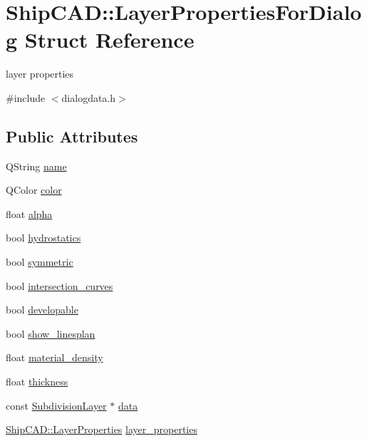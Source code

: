 \hypertarget{structShipCAD_1_1LayerPropertiesForDialog}{}\section{Ship\+C\+AD\+:\+:Layer\+Properties\+For\+Dialog Struct Reference}
\label{structShipCAD_1_1LayerPropertiesForDialog}


layer properties  




{\ttfamily \#include $<$dialogdata.\+h$>$}

\subsection*{Public Attributes}
\begin{DoxyCompactItemize}
\item 
Q\+String \hyperlink{structShipCAD_1_1LayerPropertiesForDialog_a09578942af620f75d1599887672ec8da}{name}
\item 
Q\+Color \hyperlink{structShipCAD_1_1LayerPropertiesForDialog_a20a555fd2c477f691cc04a4fe9b7f6b0}{color}
\item 
float \hyperlink{structShipCAD_1_1LayerPropertiesForDialog_a8ecd6d4c933122d9f3c8f3c8fcf54781}{alpha}
\item 
bool \hyperlink{structShipCAD_1_1LayerPropertiesForDialog_a2ac6ce1339e9dfc028016c5bacea3cae}{hydrostatics}
\item 
bool \hyperlink{structShipCAD_1_1LayerPropertiesForDialog_a3acf39b44721d89ea8906052cc0bedde}{symmetric}
\item 
bool \hyperlink{structShipCAD_1_1LayerPropertiesForDialog_a6003cb18c39e66df709658c14203d066}{intersection\+\_\+curves}
\item 
bool \hyperlink{structShipCAD_1_1LayerPropertiesForDialog_ab2610addf8f227b9b9f00e9f275f6342}{developable}
\item 
bool \hyperlink{structShipCAD_1_1LayerPropertiesForDialog_a7df2aaba3b7824534100f46546d9479e}{show\+\_\+linesplan}
\item 
float \hyperlink{structShipCAD_1_1LayerPropertiesForDialog_a1d0c75ad5128b805bf99aab57212127f}{material\+\_\+density}
\item 
float \hyperlink{structShipCAD_1_1LayerPropertiesForDialog_aeeae5cf44e195fe6f70d4f09a4fa3fef}{thickness}
\item 
const \hyperlink{classShipCAD_1_1SubdivisionLayer}{Subdivision\+Layer} $\ast$ \hyperlink{structShipCAD_1_1LayerPropertiesForDialog_a0bcd4eb69a1b82c26e9dfcf1707cf850}{data}
\item 
\hyperlink{structShipCAD_1_1LayerProperties}{Ship\+C\+A\+D\+::\+Layer\+Properties} \hyperlink{structShipCAD_1_1LayerPropertiesForDialog_a3175b253fd29d654cafe5b359f34a2b4}{layer\+\_\+properties}
\end{DoxyCompactItemize}



